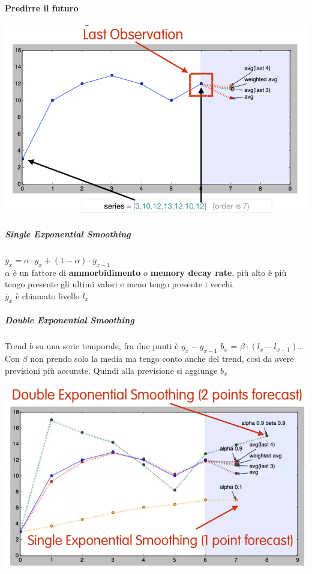 \documentclass[10pt]{book}
\begin{document}
\paragraph{Predirre il futuro}
\begin{center}
	\includegraphics[scale=0.7]{averageforectast.png}
\end{center}
\subparagraph{Single Exponential Smoothing}
$\overline{y}_x = \alpha\cdot y_x + (1 - \alpha) \cdot \overline{y}_{x-1}$\\
$\alpha$ è un fattore di \textbf{ammorbidimento} o \textbf{memory decay rate}, più alto è più tengo presente gli ultimi valori e meno tengo presente i vecchi.\\
$\overline{y}_x$ è chiamato livello $l_x$
\subparagraph{Double Exponential Smoothing}
Trend $b$ su una serie temporale, fra due punti è $y_x - y_{x-1}$
$b_x$ = $\beta\cdot(l_x - l_{x-1})$\ldots\\
Con $\beta$ non prendo solo la media ma tengo conto anche del trend, così da avere previsioni più accurate. Quindi alla previsione si aggiunge $b_x$
\begin{center}
	\includegraphics[scale=0.7]{doubexpsmo.png}
\end{center}
\pagebreak
\end{document}
